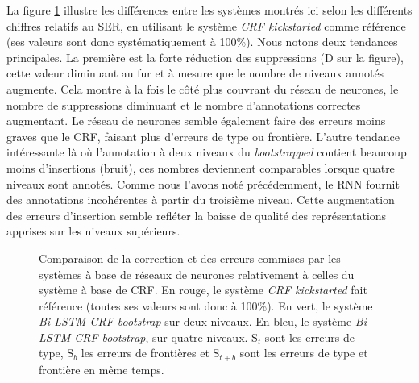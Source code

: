 \documentclass[12pt,a4paper,times,twoside,openright]{report}
\begin{document}
La figure \ref{fig:cascades-error-comparison} illustre les différences entre les systèmes montrés ici selon les différents chiffres relatifs au SER, en utilisant le système \emph{CRF kickstarted} comme référence (ses valeurs sont donc systématiquement à 100\%). Nous notons deux tendances principales. La première est la forte réduction des suppressions (D sur la figure), cette valeur diminuant au fur et à mesure que le nombre de niveaux annotés augmente. Cela montre à la fois le côté plus couvrant du réseau de neurones, le nombre de suppressions diminuant et le nombre d'annotations correctes augmentant. Le réseau de neurones semble également faire des erreurs moins graves que le CRF, faisant plus d'erreurs de type ou frontière. L'autre tendance intéressante là où l'annotation à deux niveaux du \textit{bootstrapped} contient beaucoup moins d'insertions (bruit), ces nombres deviennent comparables lorsque quatre niveaux sont annotés. Comme nous l'avons noté précédemment, le RNN fournit des annotations incohérentes à partir du troisième niveau. Cette augmentation des erreurs d'insertion semble refléter la baisse de qualité des représentations apprises sur les niveaux supérieurs.

\begin{figure}[ht!]
\centering
{}
\caption{Comparaison de la correction et des erreurs commises par les systèmes à base de réseaux de neurones relativement à celles du système à base de CRF. En rouge, le système \textit{CRF kickstarted} fait référence (toutes ses valeurs sont donc à 100\%). En vert, le système \textit{Bi-LSTM-CRF bootstrap} sur deux niveaux. En bleu, le système \textit{Bi-LSTM-CRF bootstrap}, sur quatre niveaux. S$_{t}$ sont les erreurs de type,  S$_{b}$ les erreurs de frontières et  S$_{t+b}$  sont les erreurs de type et frontière en même temps.}
\label{fig:cascades-error-comparison}
\end{figure}
\end{document}
